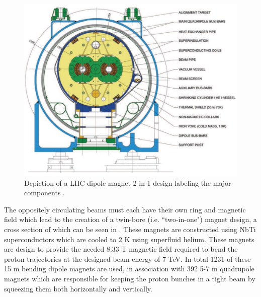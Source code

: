 \begin{figure}[!htbp] 
  \begin{center}
    \includegraphics[width=0.9\linewidth]{figures/lhc/dipole.jpg}
    \caption{ Depiction of a LHC dipole magnet 2-in-1 design labeling the major
components \cite{Dailler:842530}.} 
    \label{fig:dipole} 
  \end{center} 
\end{figure}

The oppositely circulating beams must each  have their own ring and magnetic field
which lead to the creation of a twin-bore (i.e. ``two-in-one") magnet design, a
cross section of which can be seen in . These magnets are constructed
using NbTi superconductors which are cooled to 2 K using superfluid helium.
These magnets are design to provide the needed 8.33 T magnetic field required
to bend the proton trajectories at the designed beam energy of 7 TeV.  In total 1231 of these 15
m bending dipole magnets are used, in association with 392 5-7 m
quadrupole magnets which are responsible for keeping the proton bunches in a
tight beam by squeezing them both horizontally and vertically.
